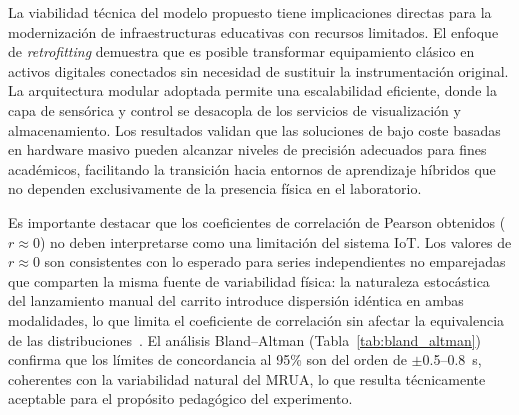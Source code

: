 \documentclass[journal,article,submit,pdftex]{Definitions/mdpi}
\begin{document}
La viabilidad t\'ecnica del modelo propuesto tiene implicaciones directas para la modernizaci\'on de infraestructuras educativas con recursos limitados. El enfoque de \textit{retrofitting} demuestra que es posible transformar equipamiento cl\'asico en activos digitales conectados sin necesidad de sustituir la instrumentaci\'on original. La arquitectura modular adoptada permite una escalabilidad eficiente, donde la capa de sens\'orica y control se desacopla de los servicios de visualizaci\'on y almacenamiento. Los resultados validan que las soluciones de bajo coste basadas en hardware masivo pueden alcanzar niveles de precisi\'on adecuados para fines acad\'emicos, facilitando la transici\'on hacia entornos de aprendizaje h\'ibridos que no dependen exclusivamente de la presencia f\'isica en el laboratorio.

Es importante destacar que los coeficientes de correlaci\'on de Pearson obtenidos ($r \approx 0$) no deben interpretarse como una limitaci\'on del sistema IoT. Los valores de $r \approx 0$ son consistentes con lo esperado para series independientes no emparejadas que comparten la misma fuente de variabilidad f\'isica: la naturaleza estoc\'astica del lanzamiento manual del carrito introduce dispersi\'on id\'entica en ambas modalidades, lo que limita el coeficiente de correlaci\'on sin afectar la equivalencia de las distribuciones~\cite{giavarina2015}. El an\'alisis Bland--Altman (Tabla~\ref{tab:bland_altman}) confirma que los l\'imites de concordancia al 95\% son del orden de $\pm$0.5--0.8~s, coherentes con la variabilidad natural del MRUA, lo que resulta t\'ecnicamente aceptable para el prop\'osito pedag\'ogico del experimento.
\end{document}
